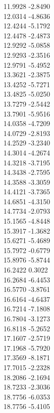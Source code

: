 {    11.9928	-2.8490\\
    12.0314	-4.8636\\
    12.4244	-5.1792\\
    12.4478	-2.4873\\
    12.9292	-5.0858\\
    12.9293	-2.3516\\
    12.9791	-5.4952\\
    13.3621	-2.3875\\
    13.4252	-5.7271\\
    13.4825	-5.0250\\
    13.7279	-2.5442\\
    13.7901	-5.9516\\
    14.0358	-4.7209\\
    14.0729	-2.8193\\
    14.2529	-3.2340\\
    14.3014	-4.2674\\
    14.3218	-3.7195\\
    14.3438	-2.7595\\
    14.3588	-3.3059\\
    14.4121	-3.7365\\
    14.6851	-4.3150\\
    14.7734	-2.0793\\
    15.1565	-4.8448\\
    15.3917	-1.3682\\
    15.6271	-5.4689\\
    15.7972	-0.6779\\
    15.8976	-5.8744\\
    16.2422	0.3022\\
    16.2684	-6.4453\\
    16.5770	-3.8761\\
    16.6164	-4.6437\\
    16.7214	-7.1808\\
    16.7804	-3.1273\\
    16.8118	-5.2652\\
    17.1607	-2.5719\\
    17.1968	-5.7920\\
    17.3569	-8.1871\\
    17.7015	-2.2328\\
    18.2086	-2.1694\\
    18.7233	-2.3036\\
    18.7756	-6.0353\\
    18.7756	-5.4105\\
}
